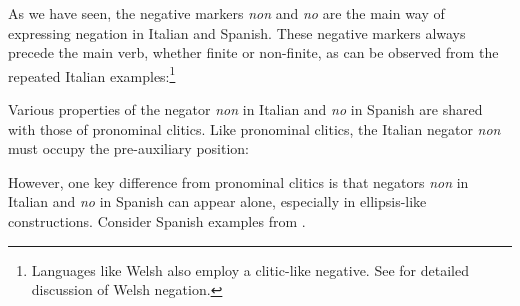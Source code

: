 \documentclass[output=paper]{langsci/langscibook}
\begin{document}
{\begin{exe}
\begin{xlist}
\begin{exe}
\begin{xlist}
As we have seen,  the negative markers \emph{non} and \emph{no} are
the main way of expressing negation in Italian and Spanish.
These negative markers always precede the main verb, whether finite or
non-finite, as can be observed from the repeated Italian
examples:\footnote{Languages like Welsh also employ a clitic-like
negative. See \citet{BJ:00} for detailed discussion
of Welsh negation.}



\eal
{}
\zl


Various properties of the negator \emph{non} in Italian
and \emph{no} in Spanish are shared with those of pronominal
clitics. Like pronominal clitics, the Italian negator \emph{non} must
occupy the pre-auxiliary position:

\eal
{}
\zl

However, one key difference from pronominal clitics is
that negators \emph{non} in Italian and \emph{no} in Spanish can appear alone,
especially in ellipsis-like constructions.
Consider Spanish examples from \citet{Lopez:94}.




\eal
{}
\zl


\end{xlist}
\end{exe}
\end{xlist}
\end{exe}}
\end{document}
